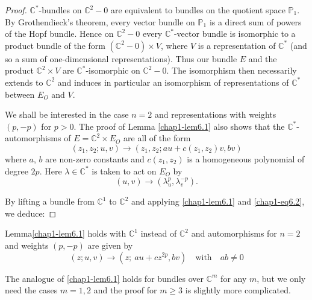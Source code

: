 \begin{proof}
$\mathbb{C}^{*}$-bundles on $\mathbb{C}^{2}-0$ are equivalent to
  bundles on the quotient space $\mathbb{P}_{1}$. By Grothendieck's
  theorem, every vector bundle on $\mathbb{P}_{1}$ is a direct sum of
  powers of the Hopf bundle. Hence on $\mathbb{C}^{2}-0$ every
  $\mathbb{C}^{*}$-vector bundle is isomorphic to a product bundle of
  the form $(\mathbb{C}^{2}-0)\times V$, where $V$ is a representation
  of $\mathbb{C}^{*}$ (and so a sum of one-dimensional
  representations). Thus our bundle $E$ and the product
  $\mathbb{C}^{2}\times V$ are $\mathbb{C}^{*}$-isomorphic on
  $\mathbb{C}^{2}-0$. The isomorphism then necessarily extends to
  $\mathbb{C}^{2}$ and induces in particular an isomorphism of
  representations of $\mathbb{C}^{*}$ between $E_{O}$ and $V$.

We shall be interested in the case $n=2$ and representations with
weights $(p,-p)$ for $p>0$. The proof of Lemma \ref{chap1-lem6.1} also
shows that the $\mathbb{C}^{*}$-automorphisms of
$E=\mathbb{C}^{2}\times E_{O}$ are all of the form
\setcounter{equation}{1}
\begin{equation}
(z_{1},z_{2};u,v)\to (z_{1},z_{2};au+c(z_{1},z_{2})v,bv)\label{chap1-eq6.2}
\end{equation}
where $a$, $b$ are non-zero constants and $c(z_{1},z_{2})$ is a
homogeneous polynomial of degree $2p$. Here $\lambda\in
\mathbb{C}^{*}$ is taken to act on $E_{O}$ by
$$
(u,v)\to \left(\lambda^{p}_{u}, \lambda^{-p}_{v}\right).
$$

By lifting a bundle from $\mathbb{C}^{1}$ to $\mathbb{C}^{2}$ and
applying \ref{chap1-lem6.1} and \eqref{chap1-eq6.2}, we deduce:
\end{proof}

\setcounter{theorem}{2}
\begin{corollary}\label{chap1-coro6.3}
Lemma\pageoriginale \ref{chap1-lem6.1} holds with $\mathbb{C}^{1}$ instead of
$\mathbb{C}^{2}$ and automorphisms for $n=2$ and weights $(p,-p)$ are
given by
$$
(z;u,v)\to (z;~au+cz^{2p},bv)\quad\text{with}\quad ab\neq 0
$$
\end{corollary}

\begin{remark*}
The analogue of \ref{chap1-lem6.1} holds for bundles over
$\mathbb{C}^{m}$ for any $m$, but we only need the cases $m=1,2$ and
the proof for $m\geq 3$ is slightly more complicated.
\end{remark*}

